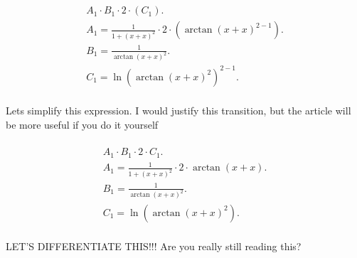 \documentclass[12pt,a4paper]{extreport}
\begin{document}
\begin{multline}
\\
A_{1} \cdot B_{1} \cdot 2 \cdot (C_{1}).\\
A_{1} = \frac{1}{1 + (x + x) ^ {2}} \cdot 2 \cdot (\arctan(x + x) ^ {2 - 1}).\\
B_{1} = \frac{1}{\arctan(x + x) ^ {2}}.\\
C_{1} = \ln(\arctan(x + x) ^ {2}) ^ {2 - 1}.\\
\end{multline}


Lets simplify this expression.
I would justify this transition, but the article will be more useful if you do it yourself 

\begin{multline}
\\
A_{1} \cdot B_{1} \cdot 2 \cdot C_{1}.\\
A_{1} = \frac{1}{1 + (x + x) ^ {2}} \cdot 2 \cdot \arctan(x + x).\\
B_{1} = \frac{1}{\arctan(x + x) ^ {2}}.\\
C_{1} = \ln(\arctan(x + x) ^ {2}).\\
\end{multline}


LET'S DIFFERENTIATE THIS!!!
Are you really still reading this? 
\end{document}
